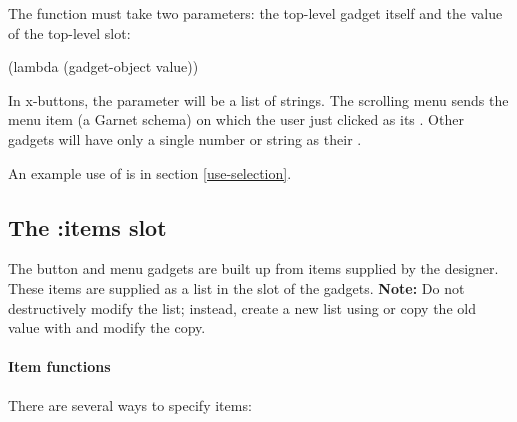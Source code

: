 The function must take two parameters: the top-level gadget itself and the
value of the top-level  slot:
\begin{programexample}
(lambda (gadget-object value))
\end{programexample}
In x-buttons, the parameter  will be a
list of strings.  The scrolling menu sends the menu item (a Garnet
schema) on which the user just clicked as its .  Other
gadgets will have only a single number or string as their .

An example use of  is in section \ref{use-selection}.


\begin{group}
\subsection{The :items slot}
\label{items-slot}
The button and menu gadgets are built up from items supplied by the designer.
These items are supplied as a list in the  slot of the gadgets.
{\bf Note:} Do not destructively modify the  list; instead, create
a new list using  or copy the old value with  and
modify the copy.
\end{group}

\paragraph{Item functions}
There are several ways to specify items:

